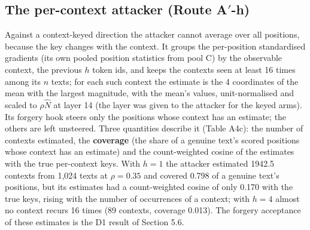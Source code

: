 \documentclass[11pt,letterpaper]{article}
\begin{document}
\hypertarget{the-per-context-attacker-route-a-h}{%
\subsection{The per-context attacker (Route A\ensuremath{'}-h)}\label{the-per-context-attacker-route-a-h}}

Against a context-keyed direction the attacker cannot average over all positions, because the key changes with the context. It groups the per-position standardised gradients (its own pooled position statistics from pool C) by the observable context, the previous \(h\) token ids, and keeps the contexts seen at least 16 times among its \(n\) texts; for each such context the estimate is the 4 coordinates of the mean with the largest magnitude, with the mean's values, unit-normalised and scaled to \(\rho \hat N\) at layer 14 (the layer was given to the attacker for the keyed arms). Its forgery hook steers only the positions whose context has an estimate; the others are left unsteered. Three quantities describe it (Table A4c): the number of contexts estimated, the \textbf{coverage} (the share of a genuine text's scored positions whose context has an estimate) and the count-weighted cosine of the estimates with the true per-context keys. With \(h = 1\) the attacker estimated 1942.5 contexts from 1,024 texts at \(\rho = 0.35\) and covered 0.798 of a genuine text's positions, but its estimates had a count-weighted cosine of only 0.170 with the true keys, rising with the number of occurrences of a context; with \(h = 4\) almost no context recurs 16 times (89 contexts, coverage 0.013). The forgery acceptance of these estimates is the D1 result of Section 5.6.
\end{document}

